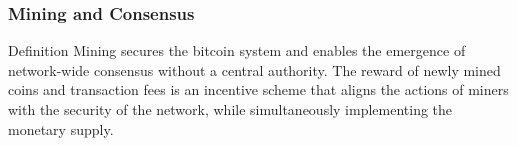 \begin{frame}
    \frametitle{Mining and Consensus}
    \begin{block}{Definition}
        Mining \alert{secures} the bitcoin system and enables the emergence of network-wide \alert{consensus} without a \alert{central authority}. The reward of newly mined coins and transaction fees is an \alert{incentive scheme} that aligns the actions of miners with the \alert{security of the network}, while simultaneously implementing the \alert{monetary supply}.
    \end{block}
    \begin{figure}[htbp]
    \end{figure}
\end{frame}

